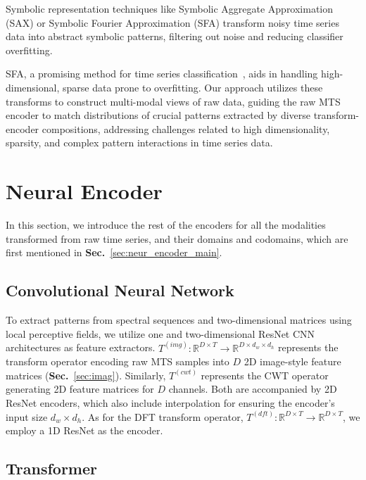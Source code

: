 \documentclass{article}
\begin{document}
Symbolic representation techniques like Symbolic Aggregate Approximation (SAX)\cite{notaristefano2013data} or Symbolic Fourier Approximation (SFA)\cite{schafer2012sfa} transform noisy time series data into abstract symbolic patterns, filtering out noise and reducing classifier overfitting.

SFA, a promising method for time series classification~\cite{tang2020interpretable}, aids in handling high-dimensional, sparse data prone to overfitting. Our approach utilizes these transforms to construct multi-modal views of raw data, guiding the raw MTS encoder to match distributions of crucial patterns extracted by diverse transform-encoder compositions, addressing challenges related to high dimensionality, sparsity, and complex pattern interactions in time series data.

\section{Neural Encoder}\label{sec:neur_encoder}

In this section, we introduce the rest of the encoders for all the modalities transformed from raw time series, and their domains and codomains, which are first mentioned in \textbf{Sec.}~\ref{sec:neur_encoder_main}.

\subsection{Convolutional Neural Network}

To extract patterns from spectral sequences and two-dimensional matrices using local perceptive fields, we utilize one and two-dimensional ResNet CNN architectures as feature extractors. $T^{(img)}: \mathbb{R}^{D\times T} \to \mathbb{R}^{D \times d_w \times d_h}$ represents the transform operator encoding raw MTS samples into $D$ 2D image-style feature matrices (\textbf{Sec.}~\ref{sec:imag}). Similarly, $T^{(cwt)}$ represents the CWT operator generating 2D feature matrices for $D$ channels. Both are accompanied by 2D ResNet encoders, which also include interpolation for ensuring the encoder's input size $d_w \times d_h$. As for the DFT transform operator, $T^{(dft)}: \mathbb{R}^{D\times T} \to \mathbb{R}^{D \times T}$, we employ a 1D ResNet as the encoder.

\subsection{Transformer}
\end{document}
